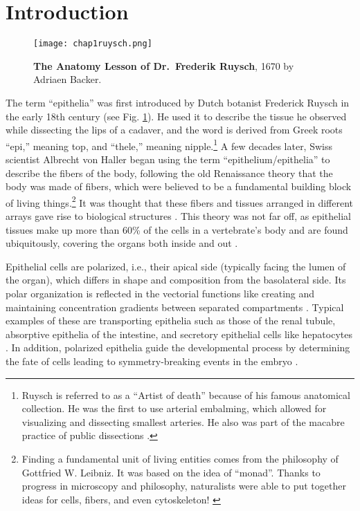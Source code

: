 

\hypertarget{introduction}{%
	\section{Introduction}\label{introduction}}

\begin{figure}[h!]
	\centering
	\texttt{[image: chap1ruysch.png]}
	\caption{\label{fig_1_1} \textbf{The Anatomy Lesson of Dr.~Frederik Ruysch}, 1670 by
		Adriaen Backer. \cite{ruyshc}}
\end{figure}

The term ``epithelia'' was first introduced by Dutch botanist Frederick Ruysch in the early 18th century (see Fig. \ref{fig_1_1}). He used it to describe the tissue he observed while dissecting the lips of a cadaver, and the word is derived from Greek roots ``epi,'' meaning top, and ``thele,'' meaning nipple.\footnote{Ruysch is referred to as a ``Artist of death'' because of his famous anatomical collection. He was the first to use arterial embalming, which allowed for visualizing and dissecting smallest arteries. He also was part of the macabre practice of public dissections \cite{halley2019}.}
A few decades later, Swiss scientist Albrecht von Haller began using the term ``epithelium/epithelia'' to describe the fibers of the body, following the old Renaissance theory that the body was made of fibers, which were believed to be a fundamental building block of living things.\footnote{Finding a fundamental unit of living entities comes from the philosophy of Gottfried W. Leibniz. It was based on the idea of ``monad''. Thanks to progress in microscopy and philosophy, naturalists were able to put together ideas for cells, fibers, and even cytoskeleton! \cite{zampieri2014}}
It was thought that these fibers and tissues arranged in different arrays gave rise to biological structures \cite{maccord2012, zampieri2014}. This theory was not far off, as epithelial tissues make up more than 60\% of the cells in a vertebrate's body and are found ubiquitously, covering the organs both inside and out \cite{alberts2015}.

Epithelial cells are polarized, i.e., their apical side (typically facing the lumen of the organ), which differs in shape and composition from the basolateral side. Its polar organization is reflected in the vectorial functions like creating and maintaining concentration gradients between separated compartments \cite{marchiando2010}. Typical examples of these are transporting epithelia such as those of the renal tubule, absorptive epithelia of the intestine, and secretory epithelial cells like hepatocytes \cite{alberts2015}. In addition, polarized epithelia guide the developmental process by determining the fate of cells leading to symmetry-breaking events in the embryo \cite{kim2018}.

